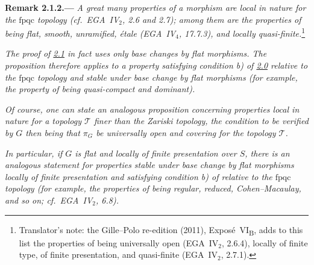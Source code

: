 \medskip
{}\label{rem:sga3-VIB-2.1.2}%
\noindent\textbf{Remark 2.1.2.---}
\emph{A great many properties of a morphism are local in nature
for the \(\mathrm{fpqc}\) topology \textup(cf.\ EGA~IV\(_2\), 2.6 and
2.7\textup); among them are the properties of being flat, smooth,
unramified, \'etale \textup(EGA~IV\(_4\), 17.7.3\textup), and locally
quasi-finite.}\footnote{Translator's note: the Gille--Polo re-edition (2011),
Expos\'e~VI\textsubscript{B}, adds to this list the properties of being universally open
(EGA~IV\(_2\), 2.6.4), locally of finite type, of finite presentation, and quasi-finite
(EGA~IV\(_2\), 2.7.1).}

\emph{The proof of \hyperref[prop:sga3-VIB-2.1]{2.1} in fact uses only base changes by flat morphisms.
The proposition therefore applies to a property satisfying
condition \textup{b)} of \hyperref[par:sga3-VIB-2.0]{2.0} relative to the \(\mathrm{fpqc}\)
topology and stable under base change by flat morphisms (for
example, the property of being quasi-compact and dominant).
}

\emph{Of course, one can state an analogous proposition concerning
properties local in nature for a topology \(\mathcal T\) finer
than the Zariski topology, the condition to be verified by \(G\)
then being that \(\pi_G\) be universally open and covering for
the topology \(\mathcal T\).
}

\emph{In particular, if \(G\) is flat and locally of finite presentation
over \(S\), there is an analogous statement for properties stable
under base change by flat morphisms locally of finite presentation
and satisfying condition \textup{b)} of  relative to the
\(\mathrm{fpqc}\) topology (for example, the properties of being
regular, reduced, Cohen--Macaulay, and so on; cf.\
EGA~IV\(_2\), 6.8).}

